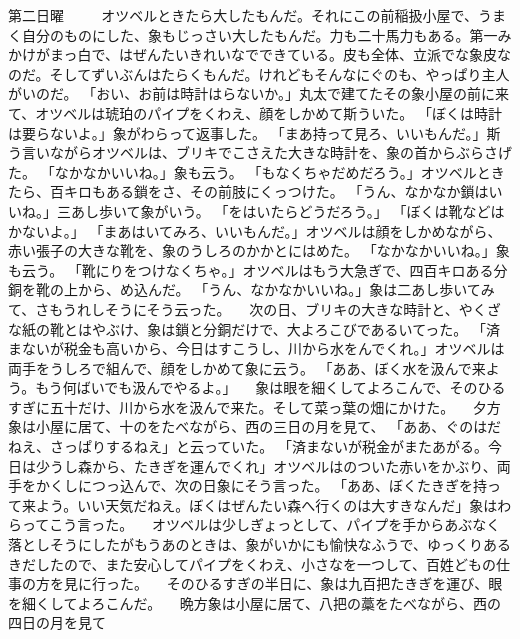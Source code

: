 第二日曜
　
　オツベルときたら大したもんだ。それにこの前稲扱小屋で、うまく自分のものにした、象もじっさい大したもんだ。力も二十馬力もある。第一みかけがまっ白で、はぜんたいきれいなでできている。皮も全体、立派でな象皮なのだ。そしてずいぶんはたらくもんだ。けれどもそんなにぐのも、やっぱり主人がいのだ。
「おい、お前は時計はらないか。」丸太で建てたその象小屋の前に来て、オツベルは琥珀のパイプをくわえ、顔をしかめて斯ういた。
「ぼくは時計は要らないよ。」象がわらって返事した。
「まあ持って見ろ、いいもんだ。」斯う言いながらオツベルは、ブリキでこさえた大きな時計を、象の首からぶらさげた。
「なかなかいいね。」象も云う。
「もなくちゃだめだろう。」オツベルときたら、百キロもある鎖をさ、その前肢にくっつけた。
「うん、なかなか鎖はいいね。」三あし歩いて象がいう。
「をはいたらどうだろう。」
「ぼくは靴などはかないよ。」
「まあはいてみろ、いいもんだ。」オツベルは顔をしかめながら、赤い張子の大きな靴を、象のうしろのかかとにはめた。
「なかなかいいね。」象も云う。
「靴にりをつけなくちゃ。」オツベルはもう大急ぎで、四百キロある分銅を靴の上から、め込んだ。
「うん、なかなかいいね。」象は二あし歩いてみて、さもうれしそうにそう云った。
　次の日、ブリキの大きな時計と、やくざな紙の靴とはやぶけ、象は鎖と分銅だけで、大よろこびであるいてった。
「済まないが税金も高いから、今日はすこうし、川から水をんでくれ。」オツベルは両手をうしろで組んで、顔をしかめて象に云う。
「ああ、ぼく水を汲んで来よう。もう何ばいでも汲んでやるよ。」
　象は眼を細くしてよろこんで、そのひるすぎに五十だけ、川から水を汲んで来た。そして菜っ葉の畑にかけた。
　夕方象は小屋に居て、十のをたべながら、西の三日の月を見て、
「ああ、ぐのはだねえ、さっぱりするねえ」と云っていた。
「済まないが税金がまたあがる。今日は少うし森から、たきぎを運んでくれ」オツベルはのついた赤いをかぶり、両手をかくしにつっ込んで、次の日象にそう言った。
「ああ、ぼくたきぎを持って来よう。いい天気だねえ。ぼくはぜんたい森へ行くのは大すきなんだ」象はわらってこう言った。
　オツベルは少しぎょっとして、パイプを手からあぶなく落としそうにしたがもうあのときは、象がいかにも愉快なふうで、ゆっくりあるきだしたので、また安心してパイプをくわえ、小さなを一つして、百姓どもの仕事の方を見に行った。
　そのひるすぎの半日に、象は九百把たきぎを運び、眼を細くしてよろこんだ。
　晩方象は小屋に居て、八把の藁をたべながら、西の四日の月を見て

